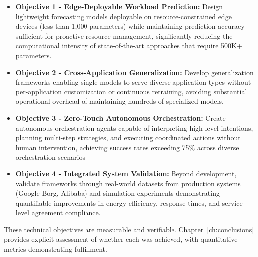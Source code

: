 \begin{itemize}
    \item \textbf{Objective 1 - Edge-Deployable Workload Prediction:} Design lightweight forecasting models deployable on resource-constrained edge devices (less than 1,000 parameters) while maintaining prediction accuracy sufficient for proactive resource management, significantly reducing the computational intensity of state-of-the-art approaches that require 500K+ parameters.
    
    \item \textbf{Objective 2 - Cross-Application Generalization:} Develop generalization frameworks enabling single models to serve diverse application types without per-application customization or continuous retraining, avoiding substantial operational overhead of maintaining hundreds of specialized models.
    
    \item \textbf{Objective 3 - Zero-Touch Autonomous Orchestration:} Create autonomous orchestration agents capable of interpreting high-level intentions, planning multi-step strategies, and executing coordinated actions without human intervention, achieving success rates exceeding 75\% across diverse orchestration scenarios.
    
    \item \textbf{Objective 4 - Integrated System Validation:} Beyond development, validate frameworks through real-world datasets from production systems (Google Borg, Alibaba) and simulation experiments demonstrating quantifiable improvements in energy efficiency, response times, and service-level agreement compliance.
\end{itemize}

These technical objectives are measurable and verifiable. Chapter~\ref{ch:conclusions} provides explicit assessment of whether each was achieved, with quantitative metrics demonstrating fulfillment.


